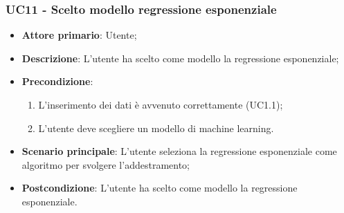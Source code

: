 \subsubsection{UC11 - Scelto modello regressione esponenziale}
\label{sssec:uc11}
\begin{itemize}
  \item \textbf{Attore primario}: Utente;
  \item \textbf{Descrizione}: L'utente ha scelto come modello la regressione esponenziale;
  \item \textbf{Precondizione}:
  \begin{enumerate}
    \item L'inserimento dei dati è avvenuto correttamente (UC1.1);
    \item L'utente deve scegliere un modello di machine learning.
  \end{enumerate}
  \item \textbf{Scenario principale}: L'utente seleziona la regressione esponenziale come algoritmo per svolgere l'addestramento;
  \item \textbf{Postcondizione}: L'utente ha scelto come modello la regressione esponenziale.
\end{itemize}
